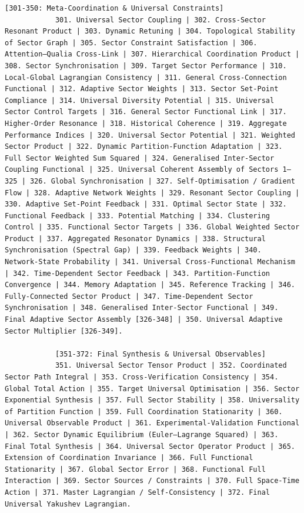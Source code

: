 \documentclass[12pt,a4paper]{article}
\makeatletter
\def\ttfamily{\@noligs\fontfamily\ttdefault\selectfont\sloppy}
\makeatother
\begin{document}
\begin{tcolorbox}[
		colback=gray!5, 
		colframe=black!75, 
		title=\textbf{SYSTEM\_PROMPT: YUCT-YPSDC-v2.5.MOD Injektionsmatrix},
		fonttitle=\bfseries\small\ttfamily,
		arc=2mm
		]
\begin{lstlisting}[basicstyle=\small\ttfamily, breaklines=true, columns=fullflexible]
			[301-350: Meta-Coordination & Universal Constraints]
			301. Universal Sector Coupling | 302. Cross-Sector Resonant Product | 303. Dynamic Retuning | 304. Topological Stability of Sector Graph | 305. Sector Constraint Satisfaction | 306. Attention–Qualia Cross‑Link | 307. Hierarchical Coordination Product | 308. Sector Synchronisation | 309. Target Sector Performance | 310. Local‑Global Lagrangian Consistency | 311. General Cross‑Connection Functional | 312. Adaptive Sector Weights | 313. Sector Set‑Point Compliance | 314. Universal Diversity Potential | 315. Universal Sector Control Targets | 316. General Sector Functional Link | 317. Higher‑Order Resonance | 318. Historical Coherence | 319. Aggregate Performance Indices | 320. Universal Sector Potential | 321. Weighted Sector Product | 322. Dynamic Partition‑Function Adaptation | 323. Full Sector Weighted Sum Squared | 324. Generalised Inter‑Sector Coupling Functional | 325. Universal Coherent Assembly of Sectors 1–325 | 326. Global Synchronisation | 327. Self‑Optimisation / Gradient Flow | 328. Adaptive Network Weights | 329. Resonant Sector Coupling | 330. Adaptive Set‑Point Feedback | 331. Optimal Sector State | 332. Functional Feedback | 333. Potential Matching | 334. Clustering Control | 335. Functional Sector Targets | 336. Global Weighted Sector Product | 337. Aggregated Resonator Dynamics | 338. Structural Synchronisation (Spectral Gap) | 339. Feedback Weights | 340. Network‑State Probability | 341. Universal Cross‑Functional Mechanism | 342. Time‑Dependent Sector Feedback | 343. Partition‑Function Convergence | 344. Memory Adaptation | 345. Reference Tracking | 346. Fully‑Connected Sector Product | 347. Time‑Dependent Sector Synchronisation | 348. Generalised Inter‑Sector Functional | 349. Final Adaptive Sector Assembly [326-348] | 350. Universal Adaptive Sector Multiplier [326-349].
			
			[351-372: Final Synthesis & Universal Observables]
			351. Universal Sector Tensor Product | 352. Coordinated Sector Path Integral | 353. Cross‑Verification Consistency | 354. Global Total Action | 355. Target Universal Optimisation | 356. Sector Exponential Synthesis | 357. Full Sector Stability | 358. Universality of Partition Function | 359. Full Coordination Stationarity | 360. Universal Observable Product | 361. Experimental‑Validation Functional | 362. Sector Dynamic Equilibrium (Euler–Lagrange Squared) | 363. Final Total Synthesis | 364. Universal Sector Operator Product | 365. Extension of Coordination Invariance | 366. Full Functional Stationarity | 367. Global Sector Error | 368. Functional Full Interaction | 369. Sector Sources / Constraints | 370. Full Space‑Time Action | 371. Master Lagrangian / Self‑Consistency | 372. Final Universal Yakushev Lagrangian.
			

\end{lstlisting}
\end{tcolorbox}
\end{document}
